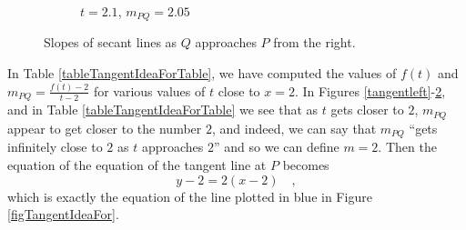 \begin{figure}[H]
\begin{subfigure}[t]{0.33\textwidth}
        \label{ }
      \caption{$ t=2.1 $, $ m_{PQ}=2.05 $}  
    \end{subfigure} 
    \caption{ Slopes of secant lines as $ Q $ approaches $ P $ from the right.  \label{tangentright} }
\end{figure}






In Table \ref{tableTangentIdeaForTable}, we have computed the values of $f(t)$ and $m_{PQ}=\frac{f(t)-2}{t-2}$ for various values of $t$ close to $x=2$.  In Figures \ref{tangentleft}-\ref{tangentright}, and in Table \ref{tableTangentIdeaForTable} we see that as $t$ gets closer to $2$, $m_{PQ}$ appear to get closer to the number $2$, and indeed, we can say that $m_{PQ}$ ``gets infinitely close to $2$ as $t$ approaches $2$'' and so we can define $m=2$. Then the equation of the equation of the tangent line at $P$ becomes
\[
y-2=2(x-2)\quad ,
\]
which is exactly the equation of the line plotted in blue in Figure \ref{figTangentIdeaFor}.

